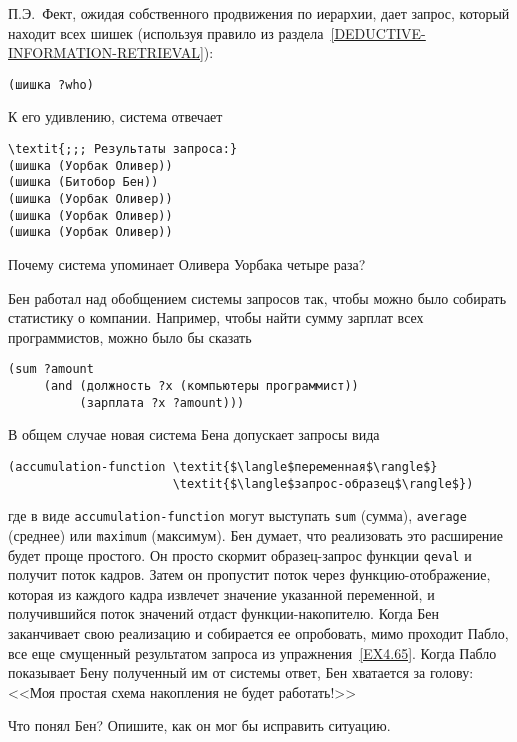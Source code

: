 \begin{exercise}{4.65}%
\label{EX4.65}%
П.Э.~Фект, ожидая собственного продвижения по
иерархии, дает запрос, который находит всех шишек (используя правило
 из 
раздела~\ref{DEDUCTIVE-INFORMATION-RETRIEVAL}):

\begin{Verbatim}[fontsize=\small]
(шишка ?who)
\end{Verbatim}
К его удивлению, система отвечает

\begin{Verbatim}[fontsize=\small]
\textit{;;; Результаты запроса:}
(шишка (Уорбак Оливер))
(шишка (Битобор Бен))
(шишка (Уорбак Оливер))
(шишка (Уорбак Оливер))
(шишка (Уорбак Оливер))
\end{Verbatim}
Почему система упоминает Оливера Уорбака четыре раза?
\end{exercise}

\begin{exercise}{4.66}%
\label{EX4.66}%
Бен работал над 
обобщением системы запросов так, чтобы
можно было собирать статистику о компании. Например, чтобы найти сумму
зарплат всех программистов, можно было бы сказать

\begin{Verbatim}[fontsize=\small]
(sum ?amount
     (and (должность ?x (компьютеры программист))
          (зарплата ?x ?amount)))
\end{Verbatim}
В общем случае новая система Бена допускает запросы вида

\begin{Verbatim}[fontsize=\small]
(accumulation-function \textit{$\langle$переменная$\rangle$}
                       \textit{$\langle$запрос-образец$\rangle$})
\end{Verbatim}
где в виде {\tt accumulation-function} могут выступать
{\tt sum} (сумма), {\tt average} (среднее) или
{\tt maximum} (максимум).  Бен думает, что реализовать это
расширение будет проще простого. Он просто скормит образец-запрос
функции {\tt qeval} и получит поток кадров.  Затем он пропустит
поток через функцию-отображение, которая из каждого кадра извлечет
значение указанной переменной, и получившийся поток значений отдаст
функции-накопителю.  Когда Бен заканчивает свою реализацию и
собирается ее опробовать, мимо проходит Пабло, все еще смущенный
результатом запроса из упражнения~\ref{EX4.65}.  Когда Пабло
показывает Бену полученный им от системы ответ, Бен хватается за
голову: <<Моя простая схема накопления не будет работать!>>

Что понял Бен?  Опишите, как он мог бы исправить
ситуацию.
\end{exercise}

